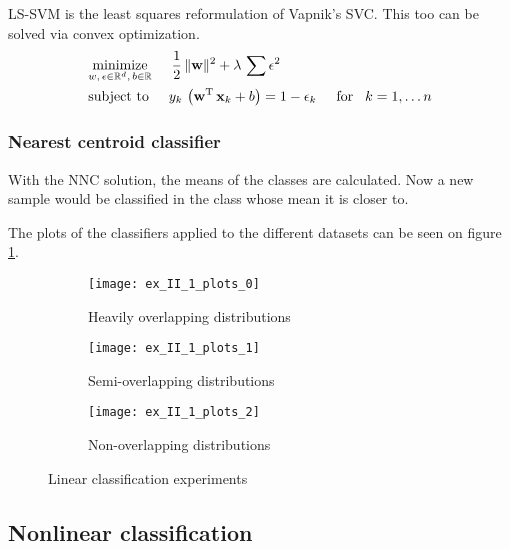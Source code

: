 LS-SVM is the least squares reformulation of Vapnik's SVC.
This too can be solved via convex optimization.
\begin{equation}
\begin{split}
	&\underset{w,\,\epsilon\in\mathbb{R}^d,\,b\in\mathbb{R}}{\operatorname{minimize}}\hspace{5mm}
		\frac{1}{2}\,\lVert\boldsymbol{\mathrm{w}}\rVert^2 + \lambda\,\sum\epsilon^2\\
	&\text{subject to}\hspace{5mm}
		y_k\,\left(\boldsymbol{\mathrm{w}}\textsuperscript{T}\,\boldsymbol{\mathrm{x}}_k + b\right) = 1-\epsilon_k\hspace{5mm}\text{for}\hspace{3mm} k=1,\dots n
\end{split}
\end{equation}

\subsubsection{Nearest centroid classifier}

With the NNC solution, the means of the classes are calculated.
Now a new sample would be classified in the class whose mean
it is closer to.

The plots of the classifiers applied to the different datasets
can be seen on figure \ref{fig:linear-classification}.

\begin{figure}[H]
	\centering
	\begin{subfigure}{\textwidth}
		\centering
		\texttt{[image: ex\_II\_1\_plots\_0]}
		\caption{Heavily overlapping distributions}
	\end{subfigure}
	\begin{subfigure}{\textwidth}
		\centering
		\texttt{[image: ex\_II\_1\_plots\_1]}
		\caption{Semi-overlapping distributions}
	\end{subfigure}
	\begin{subfigure}{\textwidth}
		\centering
		\texttt{[image: ex\_II\_1\_plots\_2]}
		\caption{Non-overlapping distributions}
	\end{subfigure}
	\caption{Linear classification experiments}
	\label{fig:linear-classification}
\end{figure}


\subsection{Nonlinear classification}

